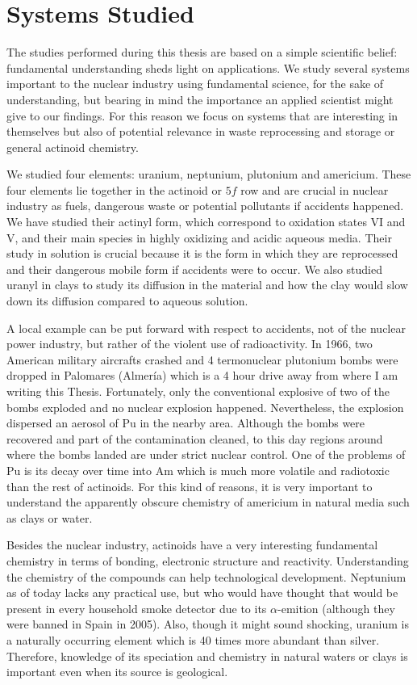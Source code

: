 \section{Systems Studied} 

The studies performed during this thesis are based on a simple scientific belief: 
fundamental understanding sheds light on applications. We study several systems important to 
the nuclear industry using fundamental science, for the sake of understanding, but bearing 
in mind the importance an applied scientist might give to our findings. For this reason we 
focus on systems that are interesting in themselves but also of potential relevance in waste 
reprocessing and storage or general actinoid chemistry. 

We studied four elements: uranium, neptunium, plutonium and americium. These four elements 
lie together in the actinoid or $5f$ row and are crucial in nuclear industry as fuels, 
dangerous waste or potential pollutants if accidents happened. We have studied their 
actinyl form,  which correspond to oxidation states VI and V, and their main 
species in highly oxidizing and acidic aqueous media. Their study in solution is 
crucial because it is the form in which they are reprocessed and their dangerous mobile form 
if accidents were to occur. We also studied uranyl in clays to study its diffusion in 
the material and how the clay would slow down its diffusion compared to aqueous solution. 

A local example can be put forward with respect to accidents, not of the nuclear power
industry, but rather of the violent use of radioactivity. In 1966, two American military 
aircrafts crashed and 4 termonuclear plutonium bombs were dropped in Palomares (Almer\'ia) 
which is a 4 hour drive away from where I am writing this Thesis.\cite{palomares} Fortunately, only 
the conventional explosive of two of the bombs exploded and no nuclear explosion happened. 
Nevertheless, the explosion dispersed an aerosol of Pu in the nearby area. Although the bombs 
were recovered and part of the contamination cleaned, to this day regions around where the 
bombs landed are under strict nuclear control. One of the problems of Pu is its decay over time 
into Am which is much more volatile and radiotoxic than the rest of actinoids. For this kind of 
reasons, it is very important to understand the apparently obscure chemistry of americium in 
natural media such as clays or water.\cite{Katz2007-ch8}

Besides the nuclear industry, actinoids have a very interesting fundamental 
chemistry\cite{Pichon2017} in terms of bonding, electronic structure and reactivity. 
Understanding the chemistry of 
the compounds can help technological development. Neptunium as of today lacks any practical 
use, but who would have thought that  would be present in every household smoke 
detector due to its $\alpha$-emition (although they were banned in Spain in 2005). Also, 
though it might sound shocking, uranium is 
a 
naturally occurring element which is 40 times more abundant than silver. Therefore, knowledge 
of its speciation and chemistry in natural waters or clays is important even when its source 
is geological.

